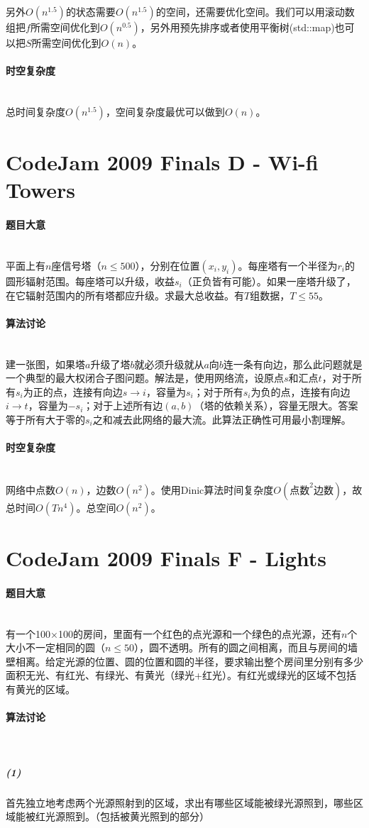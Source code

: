 \documentclass[UTF8]{ctexart}
\newcommand{\myparagraph}[1]{\paragraph{#1}\mbox{}\\}
\theoremstyle{nonumberplain}
\begin{document}
			另外$O(n^{1.5})$的状态需要$O(n^{1.5})$的空间，还需要优化空间。我们可以用滚动数组把$f$所需空间优化到$O(n^{0.5})$，另外用预先排序或者使用平衡树(std::map)也可以把$S$所需空间优化到$O(n)$。
		
		\myparagraph{时空复杂度}
		
			总时间复杂度$O(n^{1.5})$，空间复杂度最优可以做到$O(n)$。
	
	\section{CodeJam 2009 Finals D - Wi-fi Towers}
	
		\myparagraph{题目大意}
		
			平面上有$n$座信号塔（$n \leq 500$），分别在位置$(x_i,y_i)$。每座塔有一个半径为$r_i$的圆形辐射范围。每座塔可以升级，收益$s_i$（正负皆有可能）。如果一座塔升级了，在它辐射范围内的所有塔都应升级。求最大总收益。有$T$组数据，$T \leq 55$。
		
		\myparagraph{算法讨论}
		
			建一张图，如果塔$a$升级了塔$b$就必须升级就从$a$向$b$连一条有向边，那么此问题就是一个典型的最大权闭合子图问题。解法是，使用网络流，设原点$s$和汇点$t$，对于所有$s_i$为正的点，连接有向边$s \to i$，容量为$s_i$；对于所有$s_i$为负的点，连接有向边$i \to t$，容量为$-s_i$；对于上述所有边$(a,b)$（塔的依赖关系），容量无限大。答案等于所有大于零的$s_i$之和减去此网络的最大流。此算法正确性可用最小割理解。
		
		\myparagraph{时空复杂度}
		
			网络中点数$O(n)$，边数$O(n^2)$。使用Dinic算法时间复杂度$O(\mbox{点数}^2\mbox{边数})$，故总时间$O(Tn^4)$。总空间$O(n^2)$。
	
	\section{CodeJam 2009 Finals F - Lights}
	
		\myparagraph{题目大意}
		
			有一个100×100的房间，里面有一个红色的点光源和一个绿色的点光源，还有$n$个大小不一定相同的圆（$n \leq 50$），圆不透明。所有的圆之间相离，而且与房间的墙壁相离。给定光源的位置、圆的位置和圆的半径，要求输出整个房间里分别有多少面积无光、有红光、有绿光、有黄光（绿光+红光）。有红光或绿光的区域不包括有黄光的区域。
		
		\myparagraph{算法讨论}
		
			\subparagraph{(1)}
			首先独立地考虑两个光源照射到的区域，求出有哪些区域能被绿光源照到，哪些区域能被红光源照到。（包括被黄光照到的部分）
			
\end{document}
